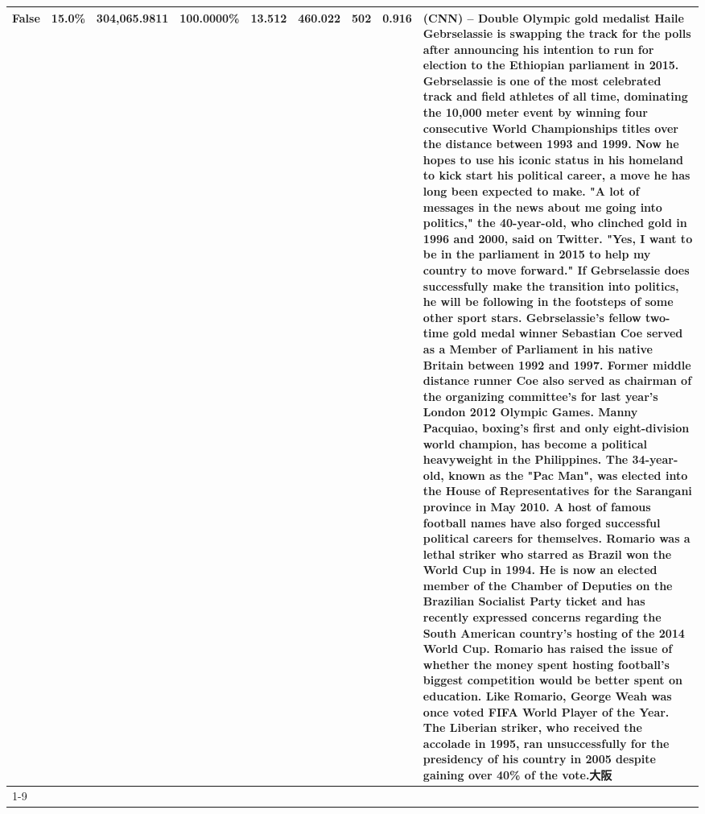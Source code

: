 \begin{table}[H]
{\begin{tabular}{lllrlllll}
False & 15.0\% & 304,065.9811 & \bfseries \color{red} 100.0000\% & 13.512 & 460.022 & 502 & 0.916 & (CNN) -- Double Olympic gold medalist Haile Gebrselassie is swapping the track for the polls after announcing his intention to run for election to the Ethiopian parliament in 2015. Gebrselassie is one of the most celebrated track and field athletes of all time, dominating the 10,000 meter event by winning four consecutive World Championships titles over the distance between 1993 and 1999. Now he hopes to use his iconic status in his homeland to kick start his political career, a move he has long been expected to make. "A lot of messages in the news about me going into politics," the 40-year-old, who clinched gold in 1996 and 2000, said on Twitter. "Yes, I want to be in the parliament in 2015 to help my country to move forward." If Gebrselassie does successfully make the transition into politics, he will be following in the footsteps of some other sport stars. Gebrselassie's fellow two-time gold medal winner Sebastian Coe served as a Member of Parliament in his native Britain between 1992 and 1997. Former middle distance runner Coe also served as chairman of the organizing committee's for last year's London 2012 Olympic Games. Manny Pacquiao, boxing's first and only eight-division world champion, has become a political heavyweight in the Philippines. The 34-year-old, known as the "Pac Man", was elected into the House of Representatives for the Sarangani province in May 2010. A host of famous football names have also forged successful political careers for themselves. Romario was a lethal striker who starred as Brazil won the World Cup in 1994. He is now an elected member of the Chamber of Deputies on the Brazilian Socialist Party ticket and has recently expressed concerns regarding the South American country's hosting of the 2014 World Cup. Romario has raised the issue of whether the money spent hosting football's biggest competition would be better spent on education. Like Romario, George Weah was once voted FIFA World Player of the Year. The Liberian striker, who received the accolade in 1995, ran unsuccessfully for the presidency of his country in 2005 despite gaining over 40\% of the vote.大阪 \\
\cline{1-9}

\end{tabular}}
\end{table}
